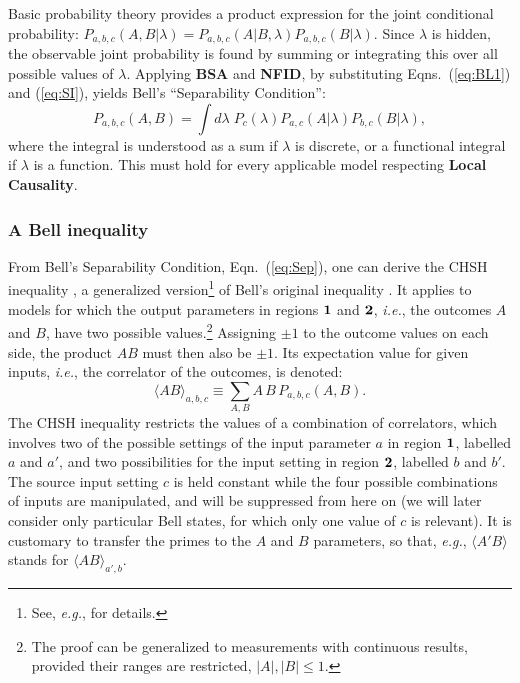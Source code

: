 \documentclass[rmp, aps, preprint, longbibliography]{revtex4-1}
\begin{document}
Basic probability theory provides a product expression for the joint conditional probability: 
$P_{a,b,c}(A,B|\lambda)=P_{a,b,c}(A|B,\lambda)P_{a,b,c}(B|\lambda)$.  Since $\lambda$ is hidden, the observable joint probability is found by summing or integrating this over all possible values of $\lambda$.  Applying {\bf BSA} and {\bf NFID}, by substituting Eqns.~(\ref{eq:BL1}) and (\ref{eq:SI}), yields Bell's ``Separability Condition'':
\begin{equation}
\label{eq:Sep}
P_{a,b,c}(A,B) = \int d\lambda \; P_{c}(\lambda) P_{a,c}(A|\lambda) P_{b,c}(B|\lambda),
\end{equation}
where the integral is understood as a sum if $\lambda$ is discrete, or a functional integral if $\lambda$ is a function.  This must hold for every applicable model respecting {\bf Local Causality}.

\subsubsection{A Bell inequality}
\label{sec:CHSH}

From Bell's Separability Condition, Eqn.~(\ref{eq:Sep}), one can derive the CHSH inequality \cite{clauser1969}, a generalized version\footnote{See, \textit{e.g.}, \textcite{bell1971} for details.} of Bell's original inequality \cite{bell1964}.  It applies to models for which the output parameters in regions $\bf{1}$ and $\bf{2}$, \textit{i.e.}, the outcomes $A$ and $B$, have two possible values.\footnote{
The proof can be generalized to measurements with continuous results, provided their ranges are restricted, $|A|,|B| \leq 1$.}  
Assigning $\pm 1$ to the outcome values on each side, the product $AB$ must then also be $\pm 1$.  Its expectation value for given inputs, \textit{i.e.}, the correlator of the outcomes, is denoted:
\begin{equation}
\label{eq:correlation}
\langle A B \rangle_{a,b,c}\equiv \sum_{A,B} A \, B \, P_{a,b,c}(A,B).
\end{equation}
The CHSH inequality restricts the values of a combination of correlators, which involves two of the possible settings of the input parameter $a$ in region $\bf{1}$, labelled $a$ and $a'$, and two possibilities for the input setting in region $\bf{2}$, labelled $b$ and $b'$.  The source input setting $c$ is held constant while the four possible combinations of inputs are manipulated, and will be suppressed from here on (we will later consider only particular Bell states, for which only one value of $c$ is relevant).  
It is customary to transfer the primes to the $A$ and $B$ parameters, so that, \emph{e.g.}, $\langle A' B \rangle$ stands for $\langle  A B \rangle_{a',b}$.
\end{document}
